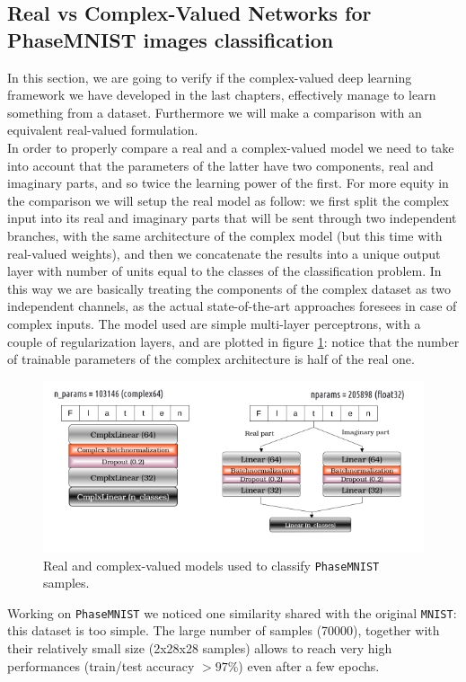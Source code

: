 \documentclass[../main.tex]{subfiles}
\begin{document}
\subsection*{Real vs Complex-Valued Networks for PhaseMNIST images classification}

In this section, we are going to verify if the complex-valued deep learning framework we have developed in the last chapters, effectively manage to learn something from a dataset. Furthermore we will make a comparison with an equivalent real-valued formulation.\\
In order to properly compare a real and a complex-valued model we need to take into account that the parameters of the latter have two components, real and imaginary parts, and so twice the learning power of the first. For more equity in the comparison we will setup the real model as follow: we first split the complex input into its real and imaginary parts that will be sent through two independent branches, with the same architecture of the complex model (but this time with real-valued weights), and then we concatenate the results into a unique output layer with number of units equal to the classes of the classification problem. In this way we are basically treating the components of the complex dataset as two independent channels, as the actual state-of-the-art approaches foresees in case of complex inputs. The model used are simple multi-layer perceptrons, with a couple of regularization layers, and are plotted in figure \ref{fig:phasemnist_models}: notice that the number of trainable parameters of the complex architecture is half of the real one.
\begin{figure}[!ht]
	\centering
	\includegraphics[width=\textwidth]{pictures/phasemnist_models}
	\caption{Real and complex-valued models used to classify \texttt{PhaseMNIST} samples.}
	\label{fig:phasemnist_models}
\end{figure}
Working on \texttt{PhaseMNIST} we noticed one similarity shared with the original \texttt{MNIST}: this dataset is too simple. The large number of samples (70000), together with their relatively small size (2x28x28 samples) allows to reach very high performances (train/test accuracy $>97\%$) even after a few epochs.\\
\end{document}
